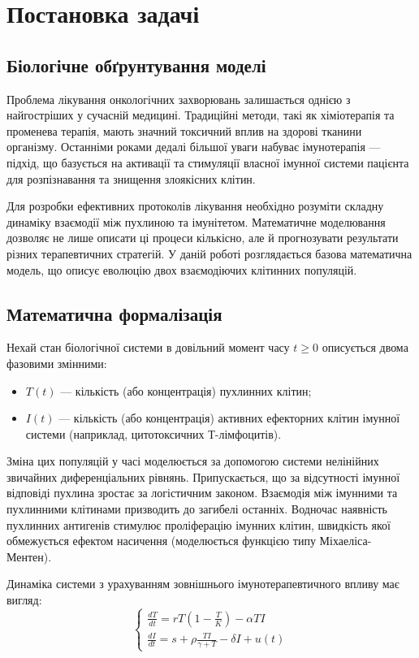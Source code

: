 \section{Постановка задачі}

\subsection{Біологічне обґрунтування моделі}
Проблема лікування онкологічних захворювань залишається однією з найгостріших у сучасній медицині. Традиційні методи, такі як хіміотерапія та променева терапія, мають значний токсичний вплив на здорові тканини організму. Останніми роками дедалі більшої уваги набуває імунотерапія — підхід, що базується на активації та стимуляції власної імунної системи пацієнта для розпізнавання та знищення злоякісних клітин.

Для розробки ефективних протоколів лікування необхідно розуміти складну динаміку взаємодії між пухлиною та імунітетом. Математичне моделювання дозволяє не лише описати ці процеси кількісно, але й прогнозувати результати різних терапевтичних стратегій. У даній роботі розглядається базова математична модель, що описує еволюцію двох взаємодіючих клітинних популяцій.

\subsection{Математична формалізація}
Нехай стан біологічної системи в довільний момент часу $t \ge 0$ описується двома фазовими змінними:
\begin{itemize}
	\item $T(t)$ — кількість (або концентрація) пухлинних клітин;
	\item $I(t)$ — кількість (або концентрація) активних ефекторних клітин імунної системи (наприклад, цитотоксичних Т-лімфоцитів).
\end{itemize}

Зміна цих популяцій у часі моделюється за допомогою системи нелінійних звичайних диференціальних рівнянь. Припускається, що за відсутності імунної відповіді пухлина зростає за логістичним законом. Взаємодія між імунними та пухлинними клітинами призводить до загибелі останніх. Водночас наявність пухлинних антигенів стимулює проліферацію імунних клітин, швидкість якої обмежується ефектом насичення (моделюється функцією типу Міхаеліса-Ментен).

Динаміка системи з урахуванням зовнішнього імунотерапевтичного впливу має вигляд:
\begin{equation}
	\begin{cases}
		\frac{dT}{dt} = r T \left( 1 - \frac{T}{K} \right) - \alpha T I \\[8pt]
		\frac{dI}{dt} = s + \rho \frac{T I}{\gamma + T} - \delta I + u(t)
	\end{cases}
\end{equation}


